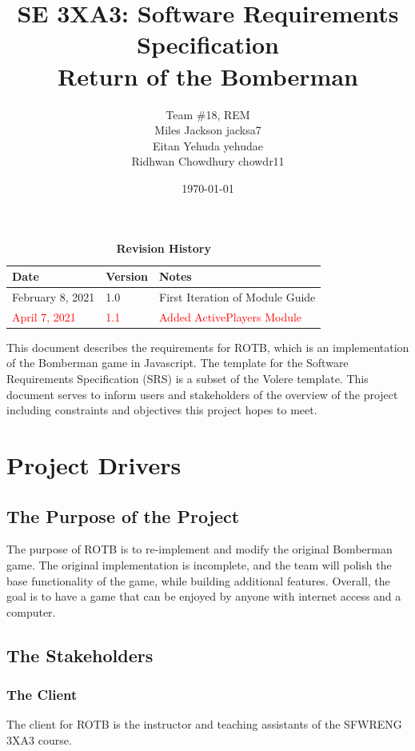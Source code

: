 \documentclass[12pt, titlepage]{article}
\title{SE 3XA3: Software Requirements Specification \\ Return of the Bomberman}
\author{Team \#18, REM
		\\ Miles Jackson  jacksa7
		\\ Eitan Yehuda  yehudae
		\\ Ridhwan Chowdhury chowdr11
}
\date{\today}
\begin{document}
\maketitle

\tableofcontents
\listoftables
\listoffigures

\begin{table}[bp]
\caption{\bf Revision History}
\begin{tabularx}{\textwidth}{p{3cm}p{2cm}X}
\toprule {\bf Date} & {\bf Version} & {\bf Notes}\\
\midrule
February 8, 2021 & 1.0 & First Iteration of Module Guide\\
\textcolor{red}{April 7, 2021} & \textcolor{red}{1.1} & \textcolor{red}{Added ActivePlayers Module}\\
\bottomrule
\end{tabularx}
\end{table}

\newpage


This document describes the requirements for ROTB, which is an implementation of the Bomberman game in Javascript. The template for the Software Requirements Specification (SRS) is a subset of the Volere template. This document serves to inform users and stakeholders of the overview of the project including constraints and objectives this project hopes to meet.

\section{Project Drivers}

\subsection{The Purpose of the Project}
The purpose of ROTB is to re-implement and modify the original Bomberman game. The original implementation is incomplete, and the team will polish the base functionality of the game, while building additional features. Overall, the goal is to have a game that can be enjoyed by anyone with internet access and a computer.

\subsection{The Stakeholders}

\subsubsection{The Client}
The client for ROTB is the instructor and teaching assistants of the SFWRENG 3XA3 course.
\end{document}
